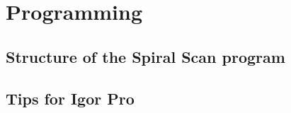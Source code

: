 
\appendix
\chapter{Programming}

\section{Structure of the Spiral Scan program}
\section{Tips for Igor Pro}
\lipsum[1]
